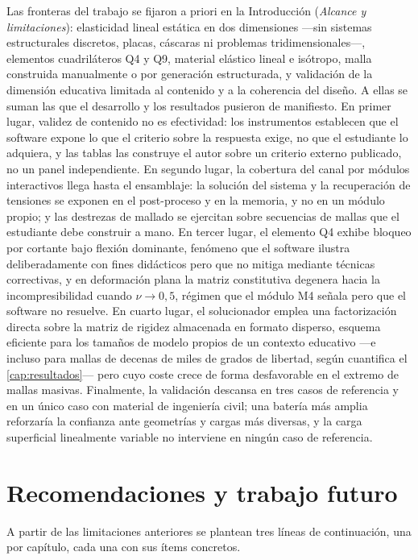 Las fronteras del trabajo se fijaron a priori en la Introducción (\emph{Alcance y limitaciones}): elasticidad lineal estática en dos dimensiones —sin sistemas estructurales discretos, placas, cáscaras ni problemas tridimensionales—, elementos cuadriláteros Q4 y Q9, material elástico lineal e isótropo, malla construida manualmente o por generación estructurada, y validación de la dimensión educativa limitada al contenido y a la coherencia del diseño. A ellas se suman las que el desarrollo y los resultados pusieron de manifiesto. En primer lugar, validez de contenido no es efectividad: los instrumentos establecen que el software expone lo que el criterio sobre la respuesta exige, no que el estudiante lo adquiera, y las tablas las construye el autor sobre un criterio externo publicado, no un panel independiente. En segundo lugar, la cobertura del canal por módulos interactivos llega hasta el ensamblaje: la solución del sistema y la recuperación de tensiones se exponen en el post-proceso y en la memoria, y no en un módulo propio; y las destrezas de mallado se ejercitan sobre secuencias de mallas que el estudiante debe construir a mano. En tercer lugar, el elemento Q4 exhibe bloqueo por cortante bajo flexión dominante, fenómeno que el software ilustra deliberadamente con fines didácticos pero que no mitiga mediante técnicas correctivas, y en deformación plana la matriz constitutiva degenera hacia la incompresibilidad cuando $\nu \to 0{,}5$, régimen que el módulo M4 señala pero que el software no resuelve. En cuarto lugar, el solucionador emplea una factorización directa sobre la matriz de rigidez almacenada en formato disperso, esquema eficiente para los tamaños de modelo propios de un contexto educativo ---e incluso para mallas de decenas de miles de grados de libertad, según cuantifica el \autoref{cap:resultados}--- pero cuyo coste crece de forma desfavorable en el extremo de mallas masivas. Finalmente, la validación descansa en tres casos de referencia y en un único caso con material de ingeniería civil; una batería más amplia reforzaría la confianza ante geometrías y cargas más diversas, y la carga superficial linealmente variable no interviene en ningún caso de referencia.

\section*{Recomendaciones y trabajo futuro}

A partir de las limitaciones anteriores se plantean tres líneas de continuación, una por capítulo, cada una con sus ítems concretos.

